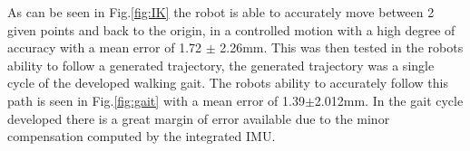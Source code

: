 \documentclass[12pt]{report}
\begin{document}
As can be seen in Fig.\ref{fig:IK} the robot is able to accurately move between 2 given points and back to the origin, in a controlled motion with a high degree of accuracy with a mean error of 1.72 $\pm$ 2.26mm. This was then tested in the robots ability to follow a generated trajectory, the generated trajectory was a single cycle of the developed walking gait. The robots ability to accurately follow this path is seen in Fig.\ref{fig:gait} with a mean error of 1.39$\pm$2.012mm. In the gait cycle developed there is a great margin of error available due to the minor compensation computed by the integrated IMU.







\end{document}
